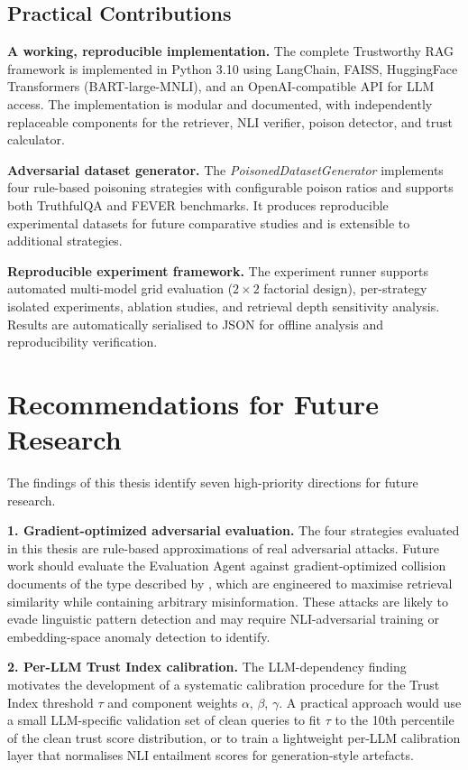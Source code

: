 \subsection{Practical Contributions}

\textbf{A working, reproducible implementation.}
The complete Trustworthy RAG framework is implemented in Python 3.10 using LangChain, FAISS, HuggingFace Transformers (BART-large-MNLI), and an OpenAI-compatible API for LLM access. The implementation is modular and documented, with independently replaceable components for the retriever, NLI verifier, poison detector, and trust calculator.

\textbf{Adversarial dataset generator.}
The \textit{PoisonedDatasetGenerator} implements four rule-based poisoning strategies with configurable poison ratios and supports both TruthfulQA and FEVER benchmarks. It produces reproducible experimental datasets for future comparative studies and is extensible to additional strategies.

\textbf{Reproducible experiment framework.}
The experiment runner supports automated multi-model grid evaluation ($2 \times 2$ factorial design), per-strategy isolated experiments, ablation studies, and retrieval depth sensitivity analysis. Results are automatically serialised to JSON for offline analysis and reproducibility verification.

\section{Recommendations for Future Research}
\label{sec:future_work}

The findings of this thesis identify seven high-priority directions for future research.

\textbf{1. Gradient-optimized adversarial evaluation.}
The four strategies evaluated in this thesis are rule-based approximations of real adversarial attacks. Future work should evaluate the Evaluation Agent against gradient-optimized collision documents of the type described by \textcite{zou2024poisoned}, which are engineered to maximise retrieval similarity while containing arbitrary misinformation. These attacks are likely to evade linguistic pattern detection and may require NLI-adversarial training or embedding-space anomaly detection to identify.

\textbf{2. Per-LLM Trust Index calibration.}
The LLM-dependency finding motivates the development of a systematic calibration procedure for the Trust Index threshold $\tau$ and component weights $\alpha$, $\beta$, $\gamma$. A practical approach would use a small LLM-specific validation set of clean queries to fit $\tau$ to the 10th percentile of the clean trust score distribution, or to train a lightweight per-LLM calibration layer that normalises NLI entailment scores for generation-style artefacts.

